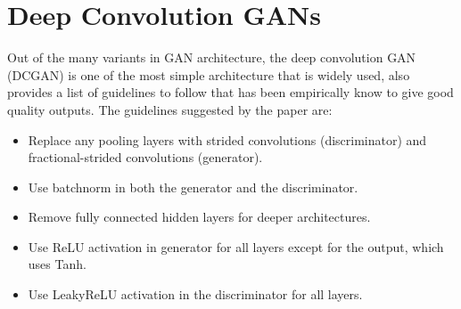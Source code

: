 \documentclass{article}
\begin{document}
\section{Deep Convolution GANs}
\label{deep convolution GANs}
Out of the many variants in GAN architecture, the deep convolution GAN (DCGAN) is one of the most simple architecture that is widely used, \cite{dcgan} also provides a list of guidelines to follow that has been empirically know to give good quality outputs. The guidelines suggested by the paper are:
\begin{itemize}
    \item Replace any pooling layers with strided convolutions (discriminator) and fractional-strided
convolutions (generator).
    \item Use batchnorm in both the generator and the discriminator.
    \item Remove fully connected hidden layers for deeper architectures.
    \item Use ReLU activation in generator for all layers except for the output, which uses Tanh.
    \item Use LeakyReLU activation in the discriminator for all layers.
\end{itemize}
\end{document}
